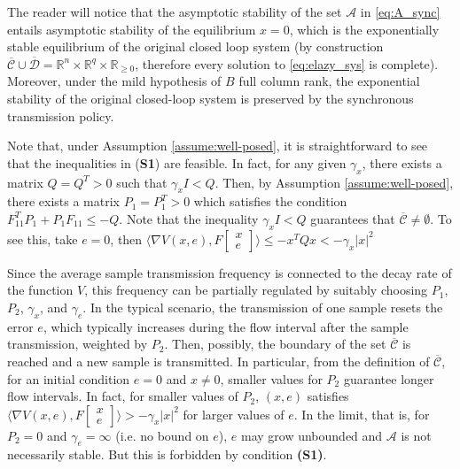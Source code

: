 \documentclass[twocolumn]{autart}
\newcommand{\realn}{\real^n}
\newcommand\real{\ensuremath{{\mathbb R}}}
\newcommand{\smallmat}[1]{\left[ \begin{smallmatrix}#1
    \end{smallmatrix} \right]}
\begin{document}
{
The reader will notice that the asymptotic stability of the set 
$\mathcal{A}$ in \eqref{eq:A_sync} entails asymptotic stability
of the equilibrium $x=0$, which is the exponentially stable 
equilibrium of the original closed loop system
(by construction $\overline{\mathcal{C}}\cup \overline{\mathcal{D}} 
= \realn\times\real^q\times\real_{\geq 0}$, therefore every solution
to \eqref{eq:elazy_sys} is complete).
Moreover, under the mild hypothesis of $B$ full column rank,
the exponential stability of the original closed-loop system
is preserved by the synchronous transmission policy.

Note that, under Assumption \ref{assume:well-posed}, 
it is straightforward to see that 
the inequalities in (\textbf{S1}) are feasible. In fact, 
for any given $\gamma_x$, 
there exists a matrix $Q=Q^T > 0$ such that
$\gamma_x I< Q$. Then, by
Assumption \ref{assume:well-posed}, there exists a matrix 
$P_1=P_1^T>0$ which satisfies the condition 
$F_{11}^TP_1+P_1F_{11} \leq -Q$.
Note that the inequality $\gamma_x I< Q$ guarantees that
$\overline{\mathcal{C}} \neq \emptyset$. To see this, take $e=0$, then
$\langle\nabla V(x,\!e), F\smallmat{x \\ e}\rangle 
\leq -x^T\!Qx  < -\gamma_x |x|^2 $

Since the average sample transmission frequency is connected to the 
decay rate of the function $V$, this frequency can be partially regulated 
by suitably choosing $P_1$, $P_2$, $\gamma_x$, and $\gamma_e$. In the typical 
scenario, the transmission of one sample resets the error $e$, which
typically increases during the flow interval after the sample transmission,  
weighted by $P_2$. Then, possibly, the boundary of 
the set $\overline{\mathcal{C}}$ is reached and a new sample is transmitted.
In particular, from the definition of $\overline{\mathcal{C}}$, for 
an initial condition $e=0$ and $x\neq 0$, smaller values for $P_2$ 
guarantee longer flow intervals. In fact, for 
smaller values of $P_2$, $(x,e)$ satisfies 
$\langle\nabla V(x,\!e), F\smallmat{x \\ e}\rangle  > -\gamma_x|x|^2$
for larger values of $e$. In the limit, that is, for $P_2=0$ 
and $\gamma_e=\infty$ (i.e. no bound on $e$),
$e$ may grow unbounded and $\mathcal{A}$ is not necessarily stable. But 
this is forbidden by condition \textbf{(S1)}.
}
\end{document}
